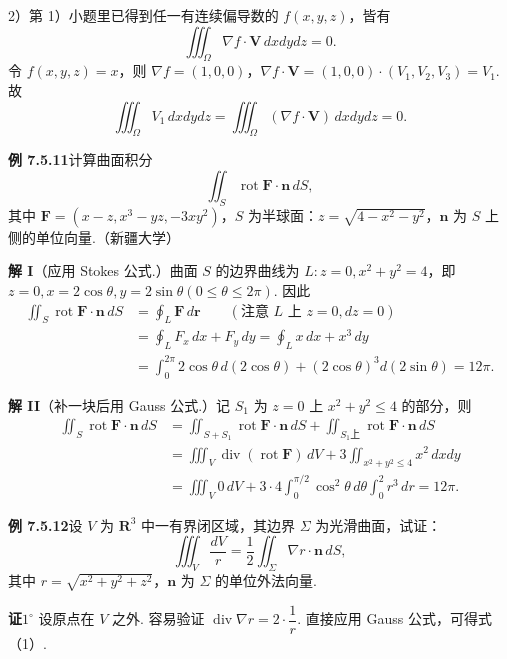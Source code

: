 \documentclass[UTF8,12pt,a4paper,fontset=fandol]{ctexart}
\begin{document}
2）第 1）小题里已得到任一有连续偏导数的 $f(x,y,z)$，皆有
\[
\iiint_\Omega \nabla f\cdot\mathbf V\,dxdy dz=0.
\]
令 $f(x,y,z)=x$，则 $\nabla f=(1,0,0)$，$\nabla f\cdot\mathbf V=(1,0,0)\cdot(V_1,V_2,V_3)=V_1$. 故
\[
\iiint_\Omega V_1\,dxdy dz=\iiint_\Omega(\nabla f\cdot\mathbf V)\,dxdy dz=0.
\]

\noindent\textbf{例 7.5.11}\quad 计算曲面积分
\[
\iint_S\operatorname{rot}\mathbf F\cdot\mathbf n\,dS,
\]
其中 $\mathbf F=(x-z,x^3-yz,-3xy^2)$，$S$ 为半球面：$z=\sqrt{4-x^2-y^2}$，$\mathbf n$ 为 $S$ 上侧的单位向量.（新疆大学）

\noindent\textbf{解 I}\quad （应用 Stokes 公式.）曲面 $S$ 的边界曲线为 $L:z=0,x^2+y^2=4$，即 $z=0,x=2\cos\theta,y=2\sin\theta(0\leqslant\theta\leqslant2\pi)$. 因此
\[
\begin{aligned}
\iint_S\operatorname{rot}\mathbf F\cdot\mathbf n\,dS
&=\oint_L\mathbf F\,d\mathbf r\qquad(\text{注意 }L\text{ 上 }z=0,dz=0)\\
&=\oint_L F_x\,dx+F_y\,dy
=\oint_Lx\,dx+x^3\,dy\\
&=\int_0^{2\pi}2\cos\theta\,d(2\cos\theta)+(2\cos\theta)^3d(2\sin\theta)=12\pi.
\end{aligned}
\]

\noindent\textbf{解 II}\quad （补一块后用 Gauss 公式.）记 $S_1$ 为 $z=0$ 上 $x^2+y^2\leqslant4$ 的部分，则
\[
\begin{aligned}
\iint_S\operatorname{rot}\mathbf F\cdot\mathbf n\,dS
&=\iint_{S+S_1}\operatorname{rot}\mathbf F\cdot\mathbf n\,dS+\iint_{S_1上}\operatorname{rot}\mathbf F\cdot\mathbf n\,dS\\
&=\iiint_V\operatorname{div}(\operatorname{rot}\mathbf F)\,dV+3\iint_{x^2+y^2\leqslant4}x^2\,dxdy\\
&=\iiint_V0\,dV+3\cdot4\int_0^{\pi/2}\cos^2\theta\,d\theta\int_0^2r^3\,dr=12\pi.
\end{aligned}
\]

\noindent\textbf{例 7.5.12}\quad 设 $V$ 为 $\mathbf R^3$ 中一有界闭区域，其边界 $\Sigma$ 为光滑曲面，试证：
\[
\iiint_V\frac{dV}{r}=\frac12\iint_\Sigma\nabla r\cdot\mathbf n\,dS, \tag{1}
\]
其中 $r=\sqrt{x^2+y^2+z^2}$，$\mathbf n$ 为 $\Sigma$ 的单位外法向量.

\noindent\textbf{证}\quad $1^\circ$ 设原点在 $V$ 之外. 容易验证 $\operatorname{div}\nabla r=2\cdot\dfrac1r$. 直接应用 Gauss 公式，可得式（1）.
\end{document}
